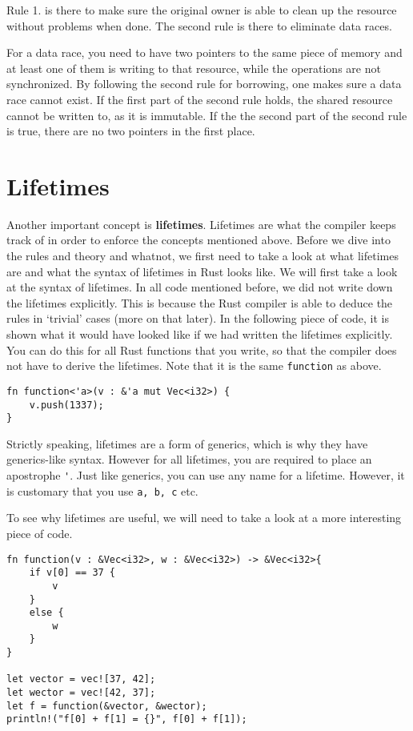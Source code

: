 Rule 1. is there to make sure the original owner is able to clean up the resource without problems when done. The second rule is there to eliminate data races. 

For a data race, you need to have two pointers to the same piece of memory and at least one of them is writing to that resource, while the operations are not synchronized. By following the second rule for borrowing, one makes sure a data race cannot exist. If the first part of the second rule holds, the shared resource cannot be written to, as it is immutable. If the the second part of the second rule is true, there are no two pointers in the first place. 

\section{Lifetimes}
Another important concept is \textbf{lifetimes}. 
Lifetimes are what the compiler keeps track of in order to enforce the concepts mentioned above. Before we dive into the rules and theory and whatnot, we first need to take a look at what lifetimes are and what the syntax of lifetimes in Rust looks like. 
We will first take a look at the syntax of lifetimes. In all code mentioned before, we did not write down the lifetimes explicitly. This is because the Rust compiler is able to deduce the rules in `trivial' cases (more on that later). In the following piece of code, it is shown what it would have looked like if we had written the lifetimes explicitly. You can do this for all Rust functions that you write, so that the compiler does not have to derive the lifetimes. Note that it is the same \verb|function| as above. 

\begin{verbatim}
fn function<'a>(v : &'a mut Vec<i32>) {
    v.push(1337);
}
\end{verbatim}

Strictly speaking, lifetimes are a form of generics, which is why they have generics-like syntax.  However for all lifetimes, you are required to place an apostrophe \verb|'|. Just like generics, you can use any name for a lifetime. However, it is customary that you use \verb|a, b, c| etc. 

To see why lifetimes are useful, we will need to take a look at a more interesting piece of code. 

\begin{verbatim}
fn function(v : &Vec<i32>, w : &Vec<i32>) -> &Vec<i32>{
    if v[0] == 37 {
        v
    }
    else {
        w
    }
}

let vector = vec![37, 42];
let wector = vec![42, 37];
let f = function(&vector, &wector);
println!("f[0] + f[1] = {}", f[0] + f[1]);
\end{verbatim}

